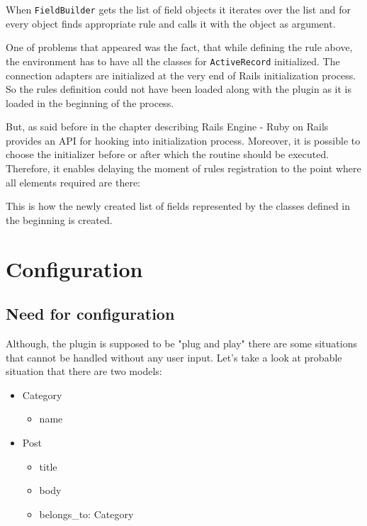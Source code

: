         When \texttt{FieldBuilder} gets the list of field objects it iterates over the list and for every object
        finds appropriate rule and calls it with the object as argument.
        
        One of problems that appeared was the fact, that while defining the rule above, the environment
        has to have all the classes for \texttt{ActiveRecord} initialized. The connection adapters are initialized
        at the very end of Rails initialization process. So the rules definition could not have been 
        loaded along with the plugin as it is loaded in the beginning of the process. 
        
        But, as said before in the chapter describing Rails Engine - Ruby on Rails provides an API for hooking into 
        initialization process. Moreover, it is possible to choose the initializer before or after which the routine
        should be executed. Therefore, it enables delaying the moment of rules registration to the point
        where all elements required are there:
        
        
        
        This is how the newly created list of fields represented by the classes defined in the beginning
        is created.
        
  \section{Configuration}
    \subsection{Need for configuration}
      Although, the plugin is supposed to be "plug and play" there are some situations that cannot be handled without
      any user input. Let's take a look at probable situation that there are two models:
        \begin{itemize}
          \item Category
          \begin{itemize}
            \item name
          \end{itemize}
          \item Post
          \begin{itemize}
            \item title
            \item body
            \item belongs\_to: Category
          \end{itemize}
        \end{itemize}
        
